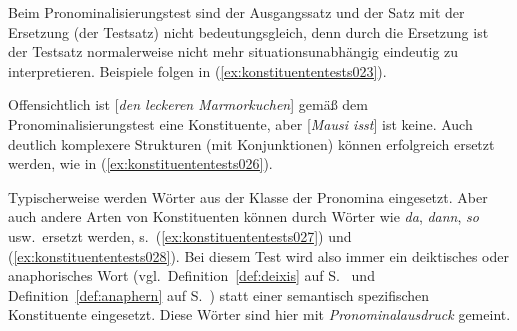 Beim Pronominalisierungstest sind der Ausgangssatz und der Satz mit der Ersetzung (der Testsatz) nicht bedeutungsgleich, denn durch die Ersetzung ist der Testsatz normalerweise nicht mehr situationsunabhängig eindeutig zu interpretieren.
Beispiele folgen in (\ref{ex:konstituententests023}).

\begin{exe}
  \ex\label{ex:konstituententests023}
  \begin{xlist}
  \end{xlist}
\end{exe}

Offensichtlich ist [\textit{den leckeren Marmorkuchen}] gemäß dem Pronominalisierungstest eine Konstituente, aber [\textit{Mausi isst}] ist keine.
Auch deutlich komplexere Strukturen (\zB mit Konjunktionen) können erfolgreich ersetzt werden, wie in (\ref{ex:konstituententests026}).

\begin{exe}
\end{exe}

Typischerweise werden Wörter aus der Klasse der Pronomina eingesetzt.
Aber auch andere Arten von Konstituenten können durch Wörter wie \textit{da}, \textit{dann}, \textit{so} usw.\ ersetzt werden, s.\ (\ref{ex:konstituententests027}) und (\ref{ex:konstituententests028}).
Bei diesem Test wird also immer ein deiktisches oder anaphorisches Wort (vgl.\ Definition~\ref{def:deixis} auf S.~\pageref{def:deixis} und Definition~\ref{def:anaphern} auf S.~\pageref{def:anaphern}) statt einer semantisch spezifischen Konstituente eingesetzt.
Diese Wörter sind hier mit \textit{Pronominalausdruck} gemeint.

\begin{exe}
\end{exe}

